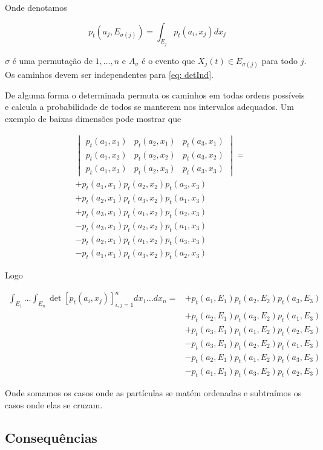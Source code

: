 Onde denotamos

\[
	p_t(a_j, E_{\sigma(j)}) = \int_{E_j} p_t(a_i, x_j) dx_j
\]

$\sigma$ é uma permutação de ${1, \dots, n}$ e $A_{\sigma}$ é o evento que $X_j(t) \in E_{\sigma(j)}$ para todo $j$. Os caminhos devem ser independentes para \eqref{eq: detInd}.

De alguma forma o determinada permuta os caminhos em todas ordens possíveis e calcula a probabilidade de todos se manterem nos intervalos adequados. Um exemplo de baixas dimensões pode mostrar que


\begin{align}
	&
	\begin{vmatrix}
		p_t(a_1, x_1) & p_t(a_2, x_1) & p_t(a_3, x_1) \\
		p_t(a_1, x_2) & p_t(a_2, x_2) & p_t(a_3, x_2) \\
		p_t(a_1, x_3) & p_t(a_2, x_3) & p_t(a_3, x_3)
	\end{vmatrix} =\\
	&
	+ p_t(a_1, x_1) p_t(a_2, x_2) p_t(a_3, x_3)  \\
	&
	+ p_t(a_2, x_1) p_t(a_3, x_2) p_t(a_1, x_3) \\
	&
	+ p_t(a_3, x_1) p_t(a_1, x_2) p_t(a_2, x_3) \\
	& 
	- p_t(a_3, x_1) p_t(a_2, x_2) p_t(a_1, x_3) \\
	&
	-  p_t(a_2, x_1) p_t(a_1, x_2) p_t(a_3, x_3) \\
	&
	- p_t(a_1, x_1) p_t(a_3, x_2) p_t(a_2, x_3)
\end{align}

Logo

\begin{align}
	\int_{E_1} \dots \int_{E_n} \det{[p_t(a_i, x_j)]^{n}_{i,j=1}}  dx_1 \dots dx_n  = 
	&
	+ p_t(a_1, E_1) p_t(a_2, E_2) p_t(a_3, E_3)  \\
	&
	+ p_t(a_2, E_1) p_t(a_3, E_2) p_t(a_1, E_3) \\
	&
	+ p_t(a_3, E_1) p_t(a_1, E_2) p_t(a_2, E_3) \\
	& 
	- p_t(a_3, E_1) p_t(a_2, E_2) p_t(a_1, E_3) \\
	&
	-  p_t(a_2, E_1) p_t(a_1, E_2) p_t(a_3, E_3) \\
	&
	- p_t(a_1, E_1) p_t(a_3, E_2) p_t(a_2, E_3)
\end{align}

Onde somamos os casos onde as partículas se matém ordenadas e subtraímos os casos onde elas se cruzam.


\subsection{Consequências}

